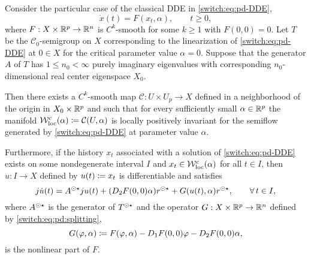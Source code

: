 \begin{corollary}\label{switch:cor:cmdde}
Consider the particular case of the classical DDE in \cref{switch:eq:pd-DDE},
\[
  \dot{x}(t)= F(x_t, \alpha), \qquad t \ge 0,
\]
where $F: X \times \mathbb{R}^p \to \mathbb{R}^n$ is $C^k$-smooth for some $k \ge 1$ with $F(0,0) = 0$. Let $T$ be the $\mathcal{C}_0$-semigroup on $X$ corresponding to the linearization of \cref{switch:eq:pd-DDE} at $0 \in X$ for the critical parameter value $\alpha = 0$. Suppose that the generator $A$ of $T$ has $1 \le n_0 < \infty$ purely imaginary eigenvalues with corresponding $n_0$-dimensional real center eigenspace $X_0$.

Then there exists a $C^k$-smooth map $\mathcal{C} : U \times U_p \to X$ defined in a neighborhood of the origin in $X_0 \times \mathbb{R}^p$ and such that for every sufficiently small $\alpha \in \mathbb{R}^p$ the manifold $\mathcal{W}^c_{\text{loc}}(\alpha) \coloneqq \mathcal{C}(U,\alpha)$ is locally positively invariant for the semiflow generated by \cref{switch:eq:pd-DDE} at parameter value $\alpha$.

Furthermore, if the history $x_t$ associated with a solution of \cref{switch:eq:pd-DDE} exists on some nondegenerate interval $I$ and $x_t \in \mathcal{W}^c_{\text{loc}}(\alpha)$ for all $t \in I$, then $u : I \to X$ defined by $u(t) \coloneqq x_t$ is differentiable and satisfies
\[
  j\dot{u}(t) = A^{\odot\star}ju(t) + (D_2F(0,0)\alpha)r^{\odot\star} + G(u(t),\alpha)r^{\odot\star}, \qquad \forall\,t \in I,
\]
where $A^{\odot\star}$ is the {\WSTAR} generator of $T^{\odot\star}$ and the operator $G : X \times \mathbb{R}^p \to \mathbb{R}^n$ defined by \cref{switch:eq:pd:splitting},
\[
  G(\varphi,\alpha) \coloneqq F(\varphi, \alpha) - D_1F(0,0)\varphi - D_2F(0,0)\alpha,
\]
is the nonlinear part of $F$.
\end{corollary}

